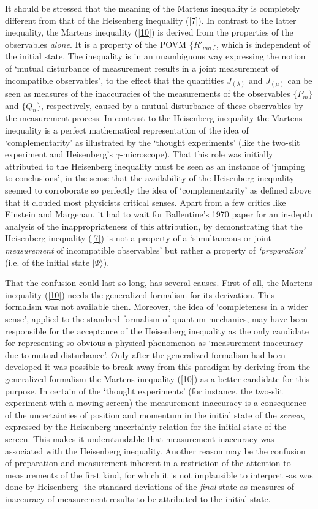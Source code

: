 \documentclass[12pt]{article}
\begin{document}
It should be stressed that the meaning of the Martens inequality
is completely different from that of the Heisenberg inequality
(\ref{7}). In contrast to the latter inequality, the Martens
inequality (\ref{10}) is derived from the properties of the
observables {\em alone}. It is a property of the POVM
$\{R'_{mn}\}$, which is independent of the initial state. The
inequality is in an unambiguous way expressing the notion of
`mutual disturbance of measurement results in a joint measurement
of incompatible observables', to the effect that the quantities
$J_{(\lambda)}$ and $J_{(\mu)}$ can be seen as measures of the
inaccuracies of the measurements of the observables $\{P_m\}$ and
$\{ Q_n\}$, respectively, caused by a mutual disturbance of these
observables by the measurement process. In contrast to the
Heisenberg inequality the Martens inequality is a perfect
mathematical representation of the idea of `complementarity' as
illustrated by the `thought experiments' (like the two-slit
experiment and Heisenberg's $\gamma$-microscope). That this role
was initially attributed to the Heisenberg inequality must be seen
as an instance of `jumping to conclusions', in the sense that the
availability of the Heisenberg inequality seemed to corroborate so
perfectly the idea of `complementarity' as defined above that it
clouded most physicists critical senses. Apart from a few critics
like Einstein and Margenau, it had to wait for Ballentine's 1970
paper for an in-depth analysis of the inappropriateness of this
attribution, by demonstrating that the Heisenberg inequality
(\ref{7}) is not a property of a `simultaneous or joint {\em
measurement} of incompatible observables' but rather a property of
{\em `preparation'} (i.e. of the initial state $|\Psi\rangle$).

That the confusion could last so long, has several causes. First
of all, the Martens inequality (\ref{10}) needs the generalized
formalism for its derivation. This formalism was not available
then. Moreover, the idea of `completeness in a wider sense',
applied to the standard formalism of quantum mechanics, may have
been responsible for the acceptance of the Heisenberg inequality
as the only candidate for representing so obvious a physical
phenomenon as `measurement inaccuracy due to mutual disturbance'.
Only after the generalized formalism had been developed it was
possible to break away from this paradigm by deriving from the
generalized formalism the Martens inequality (\ref{10}) as a
better candidate for this purpose. In certain of the `thought
experiments' (for instance, the two-slit experiment with a moving
screen) the measurement inaccuracy is a consequence of the
uncertainties of position and momentum in the initial state of the
{\em screen}, expressed by the Heisenberg uncertainty relation for
the initial state of the screen. This makes it understandable that
measurement inaccuracy was associated with the Heisenberg
inequality. Another reason may be the confusion of preparation and
measurement inherent in a restriction of the attention to
measurements of the first kind, for which it is not implausible to
interpret -as was done by Heisenberg- the standard deviations of
the {\em final} state as measures of inaccuracy of measurement
results to be attributed to the initial state.
\end{document}
